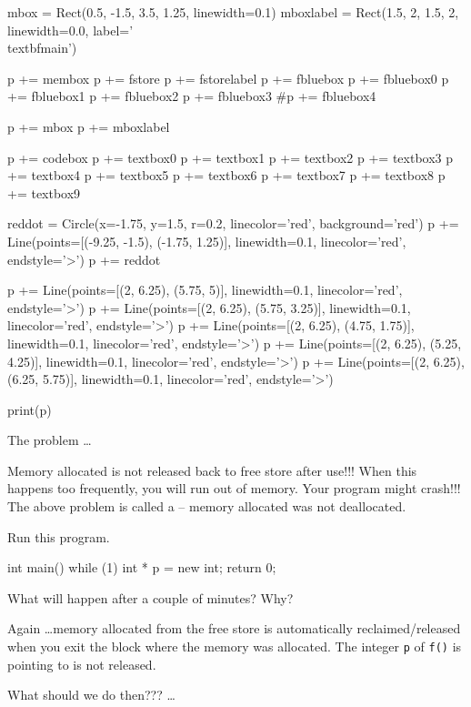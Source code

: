 \begin{python}
mbox = Rect(0.5, -1.5, 3.5, 1.25, linewidth=0.1)
mboxlabel = Rect(1.5, 2, 1.5, 2, linewidth=0.0, label='\\textbf{main}')

p += membox
p += fstore
p += fstorelabel
p += fbluebox
p += fbluebox0
p += fbluebox1
p += fbluebox2
p += fbluebox3
#p += fbluebox4

p += mbox
p += mboxlabel

p += codebox
p += textbox0
p += textbox1
p += textbox2
p += textbox3
p += textbox4
p += textbox5
p += textbox6
p += textbox7
p += textbox8
p += textbox9

reddot = Circle(x=-1.75, y=1.5, r=0.2, linecolor='red', background='red')
p += Line(points=[(-9.25, -1.5), (-1.75, 1.25)], linewidth=0.1, linecolor='red', endstyle='>')
p += reddot

p += Line(points=[(2, 6.25), (5.75, 5)], linewidth=0.1, linecolor='red', endstyle='>')
p += Line(points=[(2, 6.25), (5.75, 3.25)], linewidth=0.1, linecolor='red', endstyle='>')
p += Line(points=[(2, 6.25), (4.75, 1.75)], linewidth=0.1, linecolor='red', endstyle='>')
p += Line(points=[(2, 6.25), (5.25, 4.25)], linewidth=0.1, linecolor='red', endstyle='>')
p += Line(points=[(2, 6.25), (6.25, 5.75)], linewidth=0.1, linecolor='red', endstyle='>')

print(p)
\end{python}

The problem \ldots

Memory allocated is not released back to free store after use!!! When this happens too frequently, you will run out of memory. Your program might crash!!! The above problem is called a  -- memory allocated was not deallocated.

\begin{ex}
Run this program.

\begin{consolethree}[escapeinside=||]
int main()
{
    while (1)
    {
        int * p = new int;
    }
    return 0;
}
\end{consolethree}
What will happen after a couple of minutes? Why?
\end{ex}

Again \ldots memory allocated from the free store is  automatically reclaimed/released when you exit the block where the memory was allocated. The integer \texttt{p} of \texttt{f()} is pointing to is not released.

What should we do then??? \ldots

